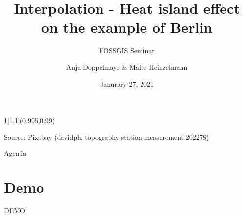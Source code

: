 \documentclass[aspectratio=169]{beamer}
\title{Interpolation - Heat island effect on the example of Berlin}
\subtitle{FOSSGIS Seminar}
\date{Janurary 27, 2021}
\author{Anja Doppelmayr \& Malte Heinzelmann}
\institute{Ruprecht-Karls-Universit\"at Heidelberg}
\newlength\beamerleftmargin
\newenvironment*{env}{}{}
\begin{document}
	\begin{frame}[plain]
		\begin{textblock}{1}[1,1](0.995,0.99)
			\setlength\topsep{0pt}
			\begin{flushright}
				\tiny\color{background} Source: Pixabay (davidph, topography-station-measurement-202278)%
			\end{flushright}
		\end{textblock}
		\titlepage
	\end{frame}

	\begin{frame}{Agenda}
		\tableofcontents[]
	\end{frame}

	
	
	
	
	
	
	
	
	
	
	
	
	{
		\section{Demo}
		\begin{frame}[standout]
			\begin{env}
				\LARGE
				DEMO
			\end{env}
		\end{frame}
	}

	
	
\end{document}
